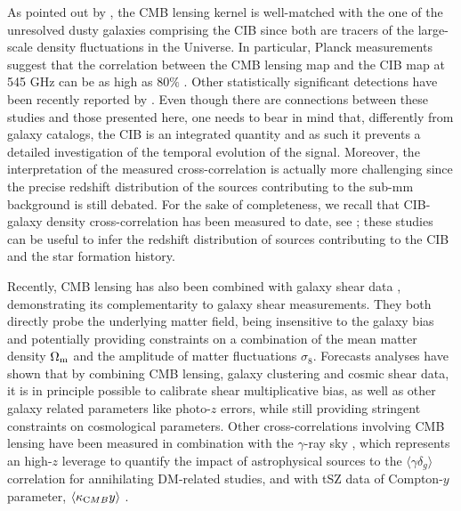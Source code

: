 As pointed out by \citet{Song2003}, the \gls{CMB} lensing kernel is well-matched with the one of the unresolved dusty galaxies comprising the \gls{CIB} since both are tracers of the large-scale density fluctuations in the Universe. In particular, Planck measurements suggest that the correlation between  the \gls{CMB} lensing map and
the \gls{CIB} map at 545 GHz can be as high as $80\%$ \citep{Ade2014a}. Other statistically significant detections have been recently reported by \cite{Holder2013,Hanson2013,Ade2014f,Engelen2015}. Even though there are connections between these studies and those presented here, one needs to bear in mind that, differently from galaxy catalogs, the \gls{CIB} is an integrated quantity and as such it prevents a detailed investigation of the temporal evolution of the signal. Moreover, the interpretation of the measured cross-correlation is actually more challenging since the precise redshift distribution of the sources contributing to the sub-mm background is still debated. For the sake of completeness, we recall that  \gls{CIB}-galaxy density cross-correlation has been measured to date, see \citet{Serra2014,Schmidt2014}; these studies can be useful to infer the redshift distribution of sources contributing to the \gls{CIB} and the star formation history.

Recently, \gls{CMB} lensing has also been combined with galaxy shear data \citep{Hand2015,Liu2015,Kirk2016,Harnois-Deraps2016}, demonstrating its complementarity to galaxy shear measurements. They both directly probe the underlying matter field, being insensitive to the galaxy bias and potentially providing constraints on a combination of the mean matter density $\Omega_{\rm m}$ and the amplitude of matter fluctuations $\sigma_8$. Forecasts analyses have shown \citep{Vallinotto2012,Das2013,Schaan2016a} that  by combining \gls{CMB} lensing, galaxy clustering and cosmic shear data, it is in principle possible to calibrate shear multiplicative bias, as well as other galaxy related parameters like photo-$z$ errors, while still providing stringent constraints on cosmological parameters. Other cross-correlations involving \gls{CMB} lensing have been measured in combination with the $\gamma$-ray sky \citep{Fornengo2015}, which represents an high-$z$ leverage to quantify the impact of astrophysical sources to the $\langle\gamma\delta_g \rangle$ correlation for annihilating \gls{DM}-related studies, and with tSZ data of Compton-$y$ parameter, $\langle \kappa_{\rm CMB}y\rangle$ \citep{Hill2014,VanWaerbeke2014}.

